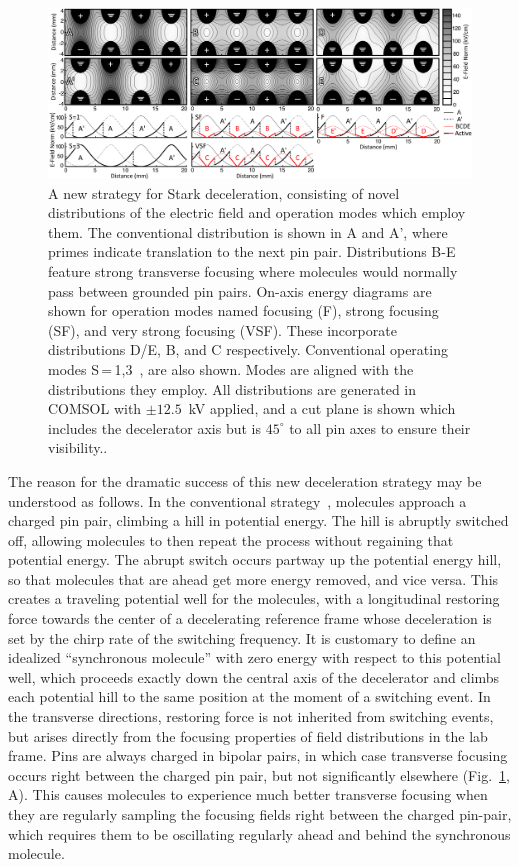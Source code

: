 \documentclass[%
 reprint,
 amsmath,amssymb,
 aps,
prl,
]{revtex4-1}
\begin{document}
\begin{figure}[t]
\includegraphics[width=\linewidth]{Configurations/pinpairformal6.png}%
\caption{
A new strategy for Stark deceleration, consisting of novel distributions of the electric field and operation modes which employ them. The conventional distribution is shown in A and A', where primes indicate translation to the next pin pair. Distributions B-E feature strong transverse focusing where molecules would normally pass between grounded pin pairs. On-axis energy diagrams are shown for operation modes named focusing (F), strong focusing (SF), and very strong focusing (VSF). These incorporate distributions D/E, B, and C respectively. Conventional operating modes S\,=\,1,3~\cite{VanDeMeerakker2005a}, are also shown. Modes are aligned with the distributions they employ. All distributions are generated in COMSOL with $\pm12.5$~kV applied, and a cut plane is shown which includes the decelerator axis but is $45^\circ$ to all pin axes to ensure their visibility.\vspace{-4mm}. 
}
\label{fig:chargecartoon}
\end{figure}

The reason for the dramatic success of this new deceleration strategy may be understood as follows.
In the conventional strategy~\cite{VanDeMeerakker2012}, molecules approach a charged pin pair, climbing a hill in potential energy. 
The hill is abruptly switched off, allowing molecules to then repeat the process without regaining that potential energy.
The abrupt switch occurs partway up the potential energy hill, so that molecules that are ahead get more energy removed, and vice versa. 
This creates a traveling potential well for the molecules, with a longitudinal restoring force towards the center of a decelerating reference frame whose deceleration is set by the chirp rate of the switching frequency.
It is customary to define an idealized ``synchronous molecule'' with zero energy with respect to this potential well, which proceeds exactly down the central axis of the decelerator and climbs each potential hill to the same position at the moment of a switching event.
In the transverse directions, restoring force is not inherited from switching events, but arises directly from the focusing properties of field distributions in the lab frame.
Pins are always charged in bipolar pairs, in which case transverse focusing occurs right between the charged pin pair, but not significantly elsewhere (Fig.~\ref{fig:chargecartoon}, A).
This causes molecules to experience much better transverse focusing when they are regularly sampling the focusing fields right between the charged pin-pair, which requires them to be oscillating regularly ahead and behind the synchronous molecule.
\end{document}
